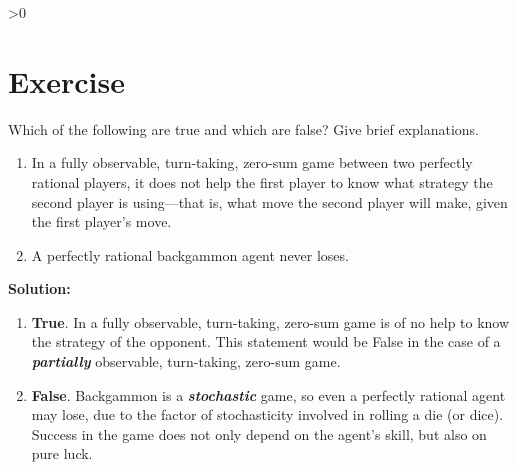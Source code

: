 \documentclass{article}
\newcounter{partCounter}
\newcounter{ExerciseCounter}
\newenvironment{Exercise}[1][-1]{
	\ifnum#1>0
	\setcounter{ExerciseCounter}{#1}
	\fi
	\section{Exercise \arabic{ExerciseCounter}}
	\setcounter{partCounter}{1}
}{
}
\newcommand{\solution}{\textbf{\large Solution:}}
\begin{document}
    \newpage

    \begin{Exercise}[2]
     		Which of the following are true and which are false? Give brief explanations.
     		\begin{enumerate}
     			\item In a fully observable, turn-taking, zero-sum game between two perfectly rational players, it does not help the first player to know what strategy the second player is using—that is, what move the second player will make, given the first player’s move.
     			\item A perfectly rational backgammon agent never loses. \\
     		\end{enumerate}
     	
     	\solution \\
        \begin{enumerate}
            \item \textbf{True}. In a fully observable, turn-taking, zero-sum game is of no help to know the strategy of the opponent. This statement would be False in the case of a \textbf{\textit{partially}} observable, turn-taking, zero-sum game.
            \item \textbf{False}. Backgammon is a \textbf{\textit{stochastic}} game, so even a perfectly rational agent may lose, due to the factor of stochasticity involved in rolling a die (or dice). Success in the game does not only depend on the agent's skill, but also on pure luck.
        \end{enumerate}
     	
    \end{Exercise}

    \newpage
\end{document}

